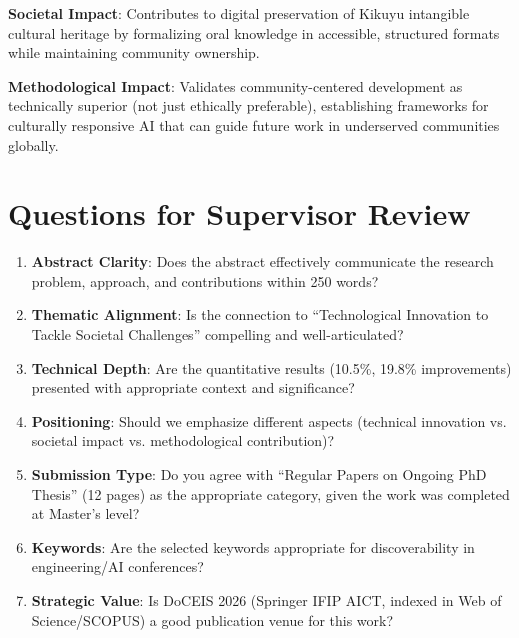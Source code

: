 \documentclass[11pt,a4paper]{article}
\begin{document}
\textbf{Societal Impact}: Contributes to digital preservation of Kikuyu intangible cultural heritage by formalizing oral knowledge in accessible, structured formats while maintaining community ownership.

\textbf{Methodological Impact}: Validates community-centered development as technically superior (not just ethically preferable), establishing frameworks for culturally responsive AI that can guide future work in underserved communities globally.

\vspace{15pt}

\section*{Questions for Supervisor Review}

\begin{enumerate}
    \item \textbf{Abstract Clarity}: Does the abstract effectively communicate the research problem, approach, and contributions within 250 words?
    
    \item \textbf{Thematic Alignment}: Is the connection to ``Technological Innovation to Tackle Societal Challenges'' compelling and well-articulated?
    
    \item \textbf{Technical Depth}: Are the quantitative results (10.5\%, 19.8\% improvements) presented with appropriate context and significance?
    
    \item \textbf{Positioning}: Should we emphasize different aspects (technical innovation vs. societal impact vs. methodological contribution)?
    
    \item \textbf{Submission Type}: Do you agree with ``Regular Papers on Ongoing PhD Thesis'' (12 pages) as the appropriate category, given the work was completed at Master's level?
    
    \item \textbf{Keywords}: Are the selected keywords appropriate for discoverability in engineering/AI conferences?
    
    \item \textbf{Strategic Value}: Is DoCEIS 2026 (Springer IFIP AICT, indexed in Web of Science/SCOPUS) a good publication venue for this work?
\end{enumerate}
\end{document}
